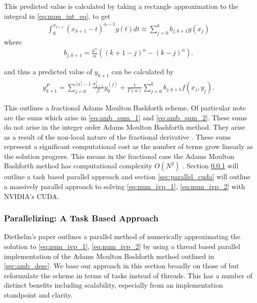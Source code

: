 This predicted value is calculated by taking a rectangle approximation to the integral in \eqref{eq:num_int_eq}, to get
\begin{align}
    \label{eq:amb_sum_2}
    \int_{0}^{x_{k+1}} (x_{k+1} - t)^{\alpha - 1} g(t) dt \approx \sum_{j=0}^k b_{j,k+1}g(x_j)
\end{align}
where
\begin{align}
    b_{j,k+1} = \frac{h^\alpha}{\alpha} \left( (k+1-j)^\alpha - (k-j)^\alpha \right).
\end{align}

and thus a predicted value of $ y_{k+1} $ can be calculated by
\begin{align}
    \label{eq:amb_y_pred}
    y_{k+1}^P = \sum_{j=0}^{\lceil \alpha \rceil - 1} \frac{x^{j}_{k+1}}{j!} y_{0}^{(j)} + \frac{1}{\Gamma(\alpha)} \sum_{j=0}^{k} b_{j,k+1} f(x_j, y_j).
\end{align}

This outlines a fractional Adams Moulton Bashforth scheme. Of particular note are the sums which arise in \eqref{eq:amb_sum_1} and \eqref{eq:amb_sum_2}. These sums do not arise in the integer order Adams Moulton Bashforth method. They arise as a result of the non-local nature of the fractional derivative \cite{Diethelm2004}. These sums represent a significant computational cost as the number of terms grow linearly as the solution progress. This means in the fractional case the Adams Moulton Bashforth method has computational complexity $ O(N^2) $ \cite{Diethelm2011}. Section \ref{sec:parallel_c} will outline a task based parallel approach and section \ref{sec:parallel_cuda} will outline a massively parallel approach to solving \eqref{eq:num_ivp_1}, \eqref{eq:num_ivp_2} with NVIDIA's CUDA.
\subsubsection{Parallelizing: A Task Based Approach}
\label{sec:parallel_c}

Diethelm's paper \cite{Diethelm2011} outlines a parallel method of numerically approximating the solution to \eqref{eq:num_ivp_1}, \eqref{eq:num_ivp_2} by using a thread based parallel implementation of the Adams Moulton Bashforth method outlined in \ref{sec:amb_desc}. We base our approach in this section broadly on those of \cite{Diethelm2011} but reformulate the scheme in terms of tasks instead of threads. This has a number of distinct benefits including scalability, especially from an implementation standpoint and clarity.

